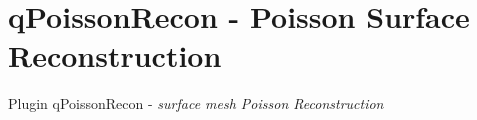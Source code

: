 \section{qPoissonRecon - Poisson Surface Reconstruction}
\label{subsection:qPoissonRecon}

Plugin qPoissonRecon - \emph{surface mesh Poisson Reconstruction}
